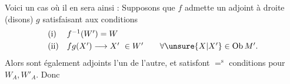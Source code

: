 Voici un cas où il en sera ainsi : Supposons que $f$ admette
un adjoint à droite (disons) $g$ satisfaisant aux conditions
\[
\begin{array}{ll}
\text{(i)} & f^{-1}(W')=W \\[3pt]
\text{(ii)} & fg(X')\longrightarrow X'\ \in W'
\qquad \forall\unsure{X|X'}\in\operatorname{Ob}M'.
\end{array}
\]
Alors
sont également adjoints l'un de l'autre, et 
satisfont $=^{\mathrm{s}}$ conditions pour $W_A,W'_A$. Donc

